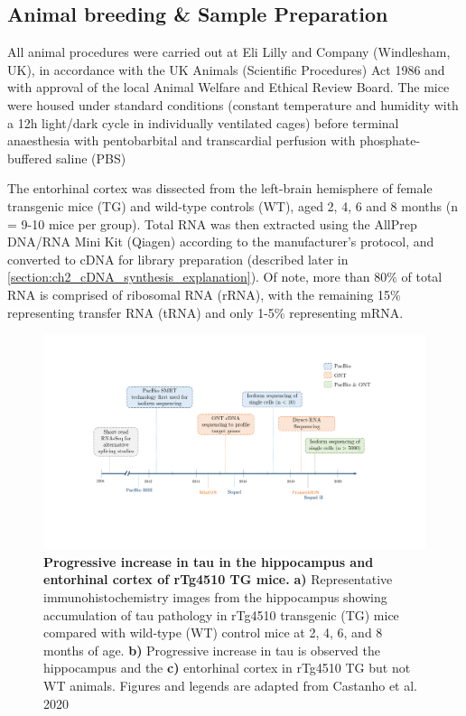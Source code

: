 \subsection{Animal breeding \& Sample Preparation}
\label{sec: animalbreeding_sample preparation}
All animal procedures were carried out at Eli Lilly and Company (Windlesham, UK), in accordance with the UK Animals (Scientific Procedures) Act 1986 and with approval of the local Animal Welfare and Ethical Review Board. The mice were housed under standard conditions (constant temperature and humidity with a 12h light/dark cycle in individually ventilated cages) before terminal anaesthesia with pentobarbital and transcardial perfusion with phosphate-buffered saline (PBS)\cite{Castanho2020}

The entorhinal cortex was dissected from the left-brain hemisphere of female transgenic mice (TG) and wild-type controls (WT), aged 2, 4, 6 and 8 months (n = 9-10 mice per group). Total RNA was then extracted\cite{Castanho2020} using the AllPrep DNA/RNA Mini Kit (Qiagen) according to the manufacturer's protocol, and converted to cDNA for library preparation (described later in \cref{section:ch2_cDNA_synthesis_explanation}). Of note, more than 80\% of total RNA is comprised of ribosomal RNA (rRNA), with the remaining 15\% representing transfer RNA (tRNA) and only 1-5\% representing mRNA. 

\begin{landscape}
	\begin{figure}[htp]
		\centering
		\vspace{20pt}
		\includegraphics[page=3,trim={0 7cm 0 0 },clip, scale = 0.7]{Figures/Introduction_Figures_Landscape.pdf}
		\captionsetup{width=1.5\textwidth}
		\caption[Progressive increase in tau in the hippocampus and entorhinal cortex of rTg4510 TG mice]%
		{\textbf{Progressive increase in tau in the hippocampus and entorhinal cortex of rTg4510 TG mice.} \textbf{a)} Representative immunohistochemistry images from the hippocampus showing accumulation of tau pathology in rTg4510 transgenic (TG) mice compared with wild-type (WT) control mice at 2, 4, 6, and 8 months of age. \textbf{b)} Progressive increase in tau is observed the hippocampus and the \textbf{c)} entorhinal cortex in rTg4510 TG but not WT animals. Figures and legends are adapted from Castanho et al. 2020 \cite{Castanho2020}}
		\label{fig:immunohistochemistry}
	\end{figure}	
\end{landscape}

